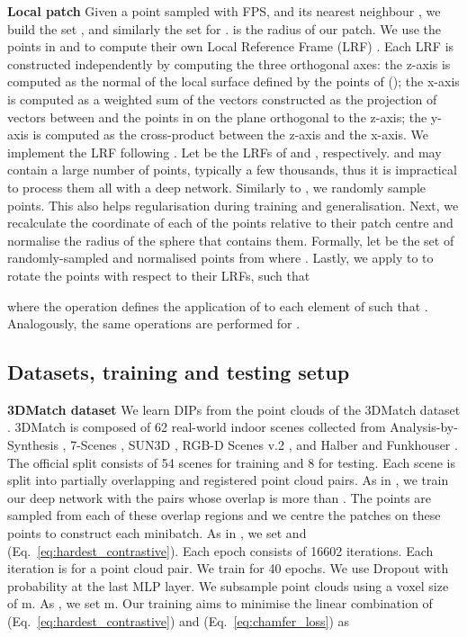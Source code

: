 \documentclass[a4paper,conference]{IEEEtran}
\begin{document}
\vspace{1mm}
\noindent \textbf{Local patch}
Given a point  sampled with FPS, and its nearest neighbour , we build the set , and similarly the set  for .
 is the radius of our patch.
We use the points in  and  to compute their own Local Reference Frame (LRF) \cite{Yang2016,Gojcic2019}.
Each LRF is constructed independently by computing the three orthogonal axes: 
the z-axis is computed as the normal of the local surface defined by the points of  (); 
the x-axis is computed as a weighted sum of the vectors constructed as the projection of vectors between  and the points in  on the plane orthogonal to the z-axis;
the y-axis is computed as the cross-product between the z-axis and the x-axis.
We implement the LRF following \cite{Gojcic2019}.
Let  be the LRFs of  and , respectively.
 and  may contain a large number of points, typically a few thousands, thus it is impractical to process them all with a deep network.
Similarly to \cite{Qi2017a}, we randomly sample  points.
This also helps regularisation during training and generalisation.
Next, we recalculate the coordinate of each of the  points relative to their patch centre and normalise the radius of the sphere that contains them.
Formally, let  be the set of randomly-sampled and normalised points from  where . 
Lastly, we apply  to  to rotate the points with respect to their LRFs, such that

where the operation  defines the application of  to each element of  such that .
Analogously, the same operations are performed for .





\subsection{Datasets, training and testing setup}\label{sec:dataset_training}

\noindent \textbf{3DMatch dataset} 
We learn DIPs from the point clouds of the 3DMatch dataset \cite{Zeng2017}.
3DMatch is composed of 62 real-world indoor scenes collected from Analysis-by-Synthesis \cite{Valentin2016}, 7-Scenes \cite{Shotton2013}, SUN3D \cite{Xiao2013}, RGB-D Scenes v.2 \cite{Kim2014}, and Halber and Funkhouser \cite{Halber2016}.
The official split consists of 54 scenes for training and 8 for testing.
Each scene is split into partially overlapping and registered point cloud pairs.
As in \cite{Gojcic2019}, we train our deep network with the pairs whose overlap is more than .
The  points are sampled from each of these overlap regions and we centre the patches on these points to construct each minibatch.
As in \cite{Choy2019}, we set  and  (Eq.~\ref{eq:hardest_contrastive}).
Each epoch consists of 16602 iterations.
Each iteration is for a point cloud pair.
We train for 40 epochs.
We use Dropout with probability  at the last MLP layer.
We subsample point clouds using a voxel size of m.
As \cite{Gojcic2019}, we set m.
Our training aims to minimise the linear combination of  (Eq.~\ref{eq:hardest_contrastive}) and  (Eq.~\ref{eq:chamfer_loss}) as
\end{document}
